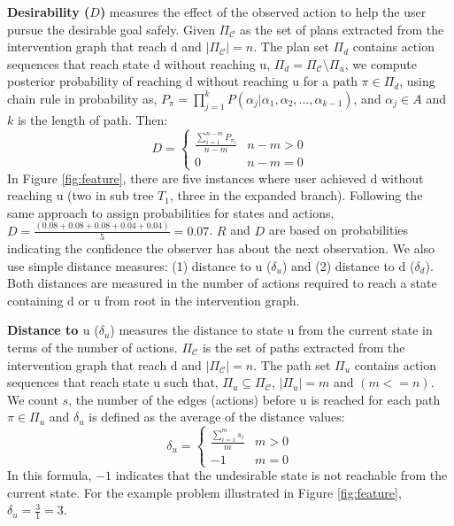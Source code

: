 \documentclass[doctor]{thesis} %
\theoremstyle{plain}
\begin{document}
\textbf{Desirability ($D$)} measures the effect of the observed action to help the user pursue the desirable goal safely. Given $\Pi_{\mathcal{C}}$ as the set of plans extracted from the intervention graph that reach $\mathrm{d}$ and $\left | \Pi_{\mathcal{C}} \right |=n$. The plan set $\Pi_{d}$ contains action sequences that reach state $\mathrm{d}$ without reaching $\mathrm{u}$, $\Pi_{d} = \Pi_{\mathcal{C}} \setminus \Pi_{u} $, we compute  posterior probability of reaching $\mathrm{d}$ without reaching $\mathrm{u}$ for a path $\pi \in \Pi_{d}$, using chain rule in probability as, $P_{\pi}=\prod_{j=1}^{k}P(\alpha_j|\alpha_1, \alpha_2,...,\alpha_{k-1})$, and $\alpha_{j} \in A$ and $k$ is the length of path. Then:
\begin{equation*} 
D = \left\{\begin{matrix}
\frac{\sum_{i=1}^{n-m}P_{\pi_i}}{n-m} & n-m>0\\ 
0 &  n-m=0
\end{matrix}\right.
\end{equation*} 
In Figure \ref{fig:feature}, there are five instances where user achieved $\mathrm{d}$  without reaching $\mathrm{u}$ (two in sub tree $T_1$, three in the expanded branch). Following the same approach to assign probabilities for states and actions, $D= \frac{(0.08+0.08+0.08+0.04+0.04)}{5} = 0.07$.
$R$ and $D$ are based on probabilities indicating the confidence the observer has about the next observation. We also use simple distance measures: (1) distance to $\mathrm{u}$  ($\delta_u$) and (2) distance to $\mathrm{d}$ ($\delta_d$). Both distances are measured in the number of actions required to reach a state containing $\mathrm{d}$ or $\mathrm{u}$ from root in the intervention graph.  

\textbf{Distance to $\boldsymbol{\mathrm{u}}$} ($\delta_u$) measures the distance to state $\mathrm{u}$ from the current state in terms of the number of actions. $\Pi_{\mathcal{C}}$ is the set of paths extracted from the intervention graph that reach $\mathrm{d}$ and $\left | \Pi_{\mathcal{C}} \right |=n$. The path set $\Pi_{u}$ contains action sequences that reach state $\mathrm{u}$ such that, $\Pi_{u} \subseteq \Pi_{\mathcal{C}}$, $\left | \Pi_{u} \right |=m$ and $(m<=n)$. We count  $s$, the number of the edges (actions) before $\mathrm{u}$ is reached for each path $\pi \in \Pi_{u}$ and $\delta_u$ is defined as the average of the distance values:
\begin{equation*} 
\delta_u = \left\{\begin{matrix}
\frac{\sum_{i=1}^{m}s_i}{m} & m>0\\ 
-1 &  m=0
\end{matrix}\right.
\end{equation*} 
In this formula, $-1$ indicates that the undesirable state is not reachable from the current state. For the example problem illustrated in Figure \ref{fig:feature}, $\delta_u=\frac{3}{1}=3$. 
\end{document}
